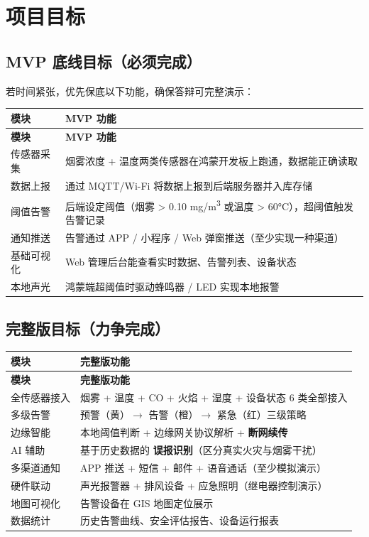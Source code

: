 \documentclass[UTF8,12pt,a4paper]{ctexart}
\begin{document}
\section{项目目标}

\subsection{MVP 底线目标（必须完成）}

若时间紧张，优先保底以下功能，确保答辩可完整演示：

\begin{longtable}{L{3.5cm}L{9.5cm}}
\toprule
\textbf{模块} & \textbf{MVP 功能} \\
\midrule
\endfirsthead
\toprule
\textbf{模块} & \textbf{MVP 功能} \\
\midrule
\endhead
\bottomrule
\endfoot

传感器采集 & 烟雾浓度 + 温度两类传感器在鸿蒙开发板上跑通，数据能正确读取 \\
\midrule
数据上报 & 通过 MQTT/Wi-Fi 将数据上报到后端服务器并入库存储 \\
\midrule
阈值告警 & 后端设定阈值（烟雾 > 0.10 mg/m\textsuperscript{3} 或温度 > 60°C），超阈值触发告警记录 \\
\midrule
通知推送 & 告警通过 APP / 小程序 / Web 弹窗推送（至少实现一种渠道） \\
\midrule
基础可视化 & Web 管理后台能查看实时数据、告警列表、设备状态 \\
\midrule
本地声光 & 鸿蒙端超阈值时驱动蜂鸣器 / LED 实现本地报警 \\
\bottomrule
\end{longtable}

\subsection{完整版目标（力争完成）}

\begin{longtable}{L{3.5cm}L{9.5cm}}
\toprule
\textbf{模块} & \textbf{完整版功能} \\
\midrule
\endfirsthead
\toprule
\textbf{模块} & \textbf{完整版功能} \\
\midrule
\endhead
\bottomrule
\endfoot

全传感器接入 & 烟雾 + 温度 + CO + 火焰 + 湿度 + 设备状态 6 类全部接入 \\
\midrule
多级告警 & 预警（黄）$\rightarrow$ 告警（橙）$\rightarrow$ 紧急（红）三级策略 \\
\midrule
边缘智能 & 本地阈值判断 + 边缘网关协议解析 + \textbf{断网续传} \\
\midrule
AI 辅助 & 基于历史数据的 \textbf{误报识别}（区分真实火灾与烟雾干扰） \\
\midrule
多渠道通知 & APP 推送 + 短信 + 邮件 + 语音通话（至少模拟演示） \\
\midrule
硬件联动 & 声光报警器 + 排风设备 + 应急照明（继电器控制演示） \\
\midrule
地图可视化 & 告警设备在 GIS 地图定位展示 \\
\midrule
数据统计 & 历史告警曲线、安全评估报告、设备运行报表 \\
\bottomrule
\end{longtable}
\end{document}
